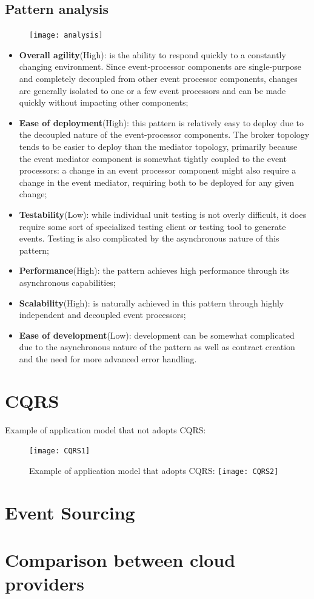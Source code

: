 \documentclass[11pt]{article} %
\begin{document}
\subsection{Pattern analysis}
\begin{figure} [H]
	\centering
	\texttt{[image: analysis]}
\end{figure}
\begin{itemize}
	\item \textbf{Overall agility}(\color{darkgreen}High\color{black}): is the ability to respond quickly to a constantly changing environment. Since event-processor components are single-purpose and completely decoupled from other event processor components, changes are generally isolated to one or a few event processors and can be made quickly without impacting other components;
	\item \textbf{Ease of deployment}(\color{darkgreen}High\color{black}): this pattern is relatively easy to deploy due to the decoupled nature of the event-processor components. The broker topology tends to be easier to deploy than the mediator topology, primarily because the event mediator component is somewhat tightly coupled to the event processors: a change in an event processor component might also require a change in the event mediator, requiring both to be deployed for any given change;
	\item \textbf{Testability}(\color{red}Low\color{black}): while individual unit testing is not overly difficult, it does require some sort of specialized testing client or testing tool to generate events. Testing is also complicated by the asynchronous nature of this pattern;
	\item \textbf{Performance}(\color{darkgreen}High\color{black}): the pattern achieves high performance through its asynchronous capabilities;
	\item \textbf{Scalability}(\color{darkgreen}High\color{black}): is naturally achieved in this pattern through highly independent and decoupled event processors;
	\item \textbf{Ease of development}(\color{red}Low\color{black}): development can be somewhat complicated due to the asynchronous nature of the pattern as well as contract creation and the need for more advanced error handling.
\end{itemize}

\newpage
\section{CQRS} 
Example of application model that not adopts CQRS:
\begin{figure} [H]
	\centering
	\texttt{[image: CQRS1]}
\end{figure}

\begin{figure} [H]
Example of application model that adopts CQRS:
	\centering
	\texttt{[image: CQRS2]}
\end{figure}

\newpage
\section{Event Sourcing} 

\newpage
\section{Comparison between cloud providers} 
\end{document}
